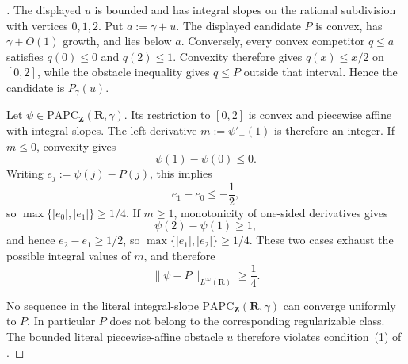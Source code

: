 \begin{proof}[]
The displayed $u$ is bounded and has integral slopes on the rational
subdivision with vertices $0,1,2$.  Put $a:=\gamma+u$.  The displayed
candidate $P$ is convex, has $\gamma+O(1)$ growth, and lies below $a$.
Conversely, every convex competitor $q\leq a$ satisfies $q(0)\leq0$ and
$q(2)\leq1$.  Convexity therefore gives $q(x)\leq x/2$ on $[0,2]$, while
the obstacle inequality gives $q\leq P$ outside that interval.  Hence the
candidate is $P_\gamma(u)$.

Let $\psi\in\mathrm{PAPC}_{\mathbf Z}(\mathbf R,\gamma)$.  Its restriction
to $[0,2]$ is convex and piecewise affine with integral slopes.  The left
derivative $m:=\psi'_{-}(1)$ is therefore an integer.  If $m\leq0$, convexity
gives
\[
                         \psi(1)-\psi(0)\leq0.
\]
Writing $e_j:=\psi(j)-P(j)$, this implies
\[
                         e_1-e_0\leq-\frac12,
\]
so $\max\{|e_0|,|e_1|\}\geq1/4$.  If $m\geq1$, monotonicity of one-sided
derivatives gives
\[
                         \psi(2)-\psi(1)\geq1,
\]
and hence $e_2-e_1\geq1/2$, so
$\max\{|e_1|,|e_2|\}\geq1/4$.  These two cases exhaust the possible integral
values of $m$, and therefore
\[
             \lVert\psi-P\rVert_{L^\infty(\mathbf R)}\geq\frac14.
\]

No sequence in the literal integral-slope
$\mathrm{PAPC}_{\mathbf Z}(\mathbf R,\gamma)$ can converge uniformly to
$P$.  In particular $P$ does not belong to the corresponding regularizable
class.  The bounded literal piecewise-affine obstacle $u$ therefore violates
condition~(1) of \cite[Theorem~6.4]{BMPS26}.
\end{proof}
